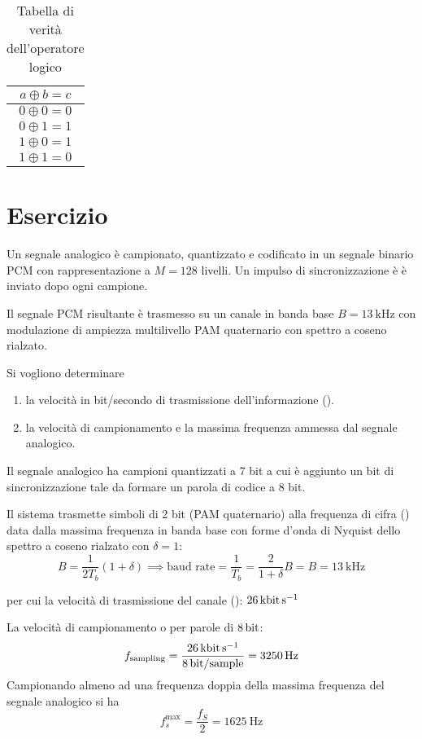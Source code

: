 \begin{table}[!ht]
	\centering
	\begin{tabular}{c}
		$a \oplus b = c$ \\ \hline
		$0 \oplus 0 = 0$ \\
		$0 \oplus 1 = 1$ \\
		$1 \oplus 0 = 1$ \\
		$1 \oplus 1 = 0$ 
	\end{tabular}
	\caption{Tabella di verità dell'operatore logico }
\end{table}

\clearpage
\section{Esercizio}
\begin{esercizio}
Un segnale analogico è campionato, quantizzato e codificato in un segnale binario \ac{PCM} con rappresentazione a $M=128$ livelli. Un impulso di sincronizzazione è è inviato dopo ogni campione.

Il segnale \ac{PCM} risultante è trasmesso su un canale in banda base $B=\SI{13}{\kilo\hertz}$ con modulazione di ampiezza multilivello \ac{PAM} quaternario con spettro a coseno rialzato.

Si vogliono determinare
\begin{enumerate}
	\item la velocità in bit/secondo di trasmissione dell'informazione ().
	\item la velocità di campionamento e la massima frequenza ammessa dal segnale analogico.
\end{enumerate}

Il segnale analogico ha campioni quantizzati a 7 bit a cui è aggiunto un bit di sincronizzazione tale da formare un parola di codice a 8 bit.

Il sistema trasmette simboli di 2 bit (\ac{PAM} quaternario) alla frequenza di cifra () data dalla massima frequenza in banda base con forme d'onda di Nyquist dello spettro a coseno rialzato con $\delta=1$:
\[ B=\frac{1}{2 T_b}(1+\delta) \implies \text{baud rate}=\frac{1}{T_b}=\frac{2}{1+\delta}B=B=\SI{13}{\kilo\hertz}\]
\end{esercizio}
per cui la velocità di trasmissione del canale (): $\SI{26}{\kilo\bit\per\second}$

La velocità di campionamento o  per parole di $\SI{8}{\bit}$:
\[f_\text{sampling}=\frac{\SI{26}{\kilo\bit\per\second}}{\SI{8}{\bit\per sample}}=\SI{3250}{\hertz}\]
Campionando almeno ad una frequenza doppia della massima frequenza del segnale analogico si ha \[f_s^\text{max}=\frac{f_S}{2}=\SI{1625}{\hertz}\]
